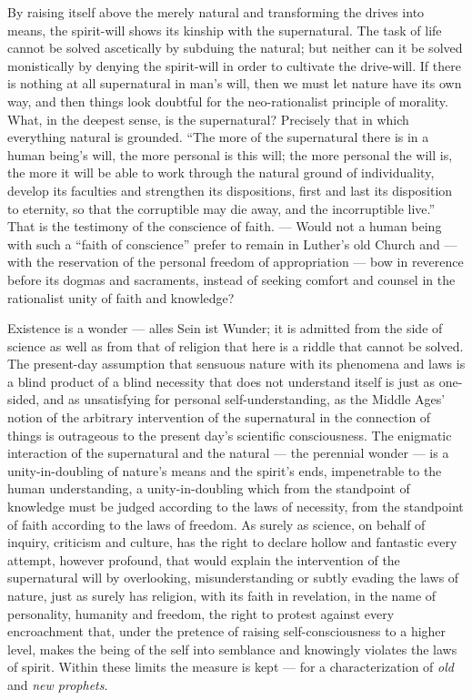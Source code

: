 \documentclass[12pt,a4paper,openany]{book}
\newcommand{\opage}[1]{\marginnote{\footnotesize\textit{[#1]}}}
\begin{document}
By raising itself above the merely natural and transforming
the drives into means, the spirit-will shows its kinship
with the supernatural. The task of life cannot
be solved ascetically by subduing the natural; but neither can it
be solved monistically by denying the spirit-will
in order to cultivate the drive-will. If there is nothing at all
supernatural in man's will, then we must let
nature have its own way, and then things look doubtful
for the neo-rationalist principle of morality. What,
in the deepest sense, is the supernatural? Precisely
that in which everything natural is grounded. ``The more of the
supernatural there is in a human being's will, the more
personal is this will; the more personal the will is,
the more it will be able to work through the natural ground
of individuality, develop its faculties and strengthen
its dispositions, first and last its disposition to eternity, so that the
corruptible may die away, and the incorruptible
live.'' That is the testimony of the conscience of faith. ---
Would not a human being with such a ``faith of conscience''
prefer to remain in Luther's old Church
and --- with the reservation of the personal freedom of appropriation
--- bow in reverence before its dogmas and sacraments,
instead of seeking comfort and counsel in the rationalist
unity of faith and knowledge?

Existence is a wonder --- alles Sein ist Wunder;
it is admitted from the side of science as well as
from that of religion that here is a riddle that cannot
be solved. The present-day assumption that sensuous
nature with its phenomena and laws is a blind
\setcounter{footnote}{0}%
\opage{112}product of a blind necessity that does not understand
itself is just as one-sided, and as unsatisfying for personal
self-understanding, as the Middle Ages'
notion of the arbitrary intervention of the supernatural
in the connection of things is outrageous to the present day's
scientific consciousness. The enigmatic interaction
of the supernatural and the natural --- the perennial
wonder --- is a unity-in-doubling of nature's means and
the spirit's ends, impenetrable to the human understanding, a unity-in-doubling which
from the standpoint of knowledge must be judged according to the laws of necessity,
from the standpoint of faith according to the laws of freedom.
As surely as science, on behalf of inquiry, criticism
and culture, has the right to declare hollow and fantastic every attempt, however
profound, that would explain the intervention of the supernatural
will by overlooking, misunderstanding or
subtly evading the laws of nature,
just as surely has religion, with its faith in revelation,
in the name of personality, humanity and freedom,
the right to protest against every encroachment that, under
the pretence of raising self-consciousness to a
higher level, makes the being of the self into semblance and knowingly
violates the laws of spirit. Within these limits
the measure is kept --- for a characterization of \emph{old}
and \emph{new prophets}.
\end{document}
